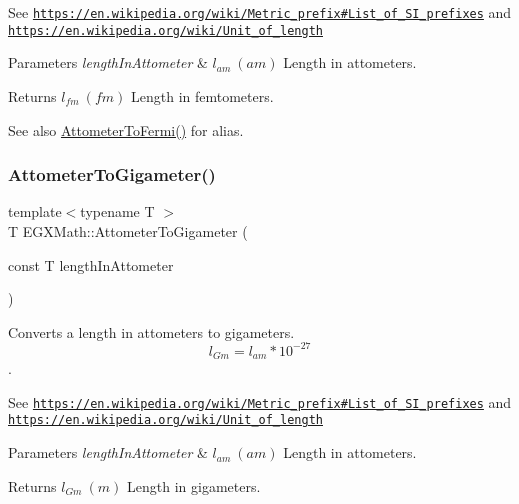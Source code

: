 See \href{https://en.wikipedia.org/wiki/Metric_prefix#List_of_SI_prefixes}{\tt https\+://en.\+wikipedia.\+org/wiki/\+Metric\+\_\+prefix\#\+List\+\_\+of\+\_\+\+S\+I\+\_\+prefixes} and \href{https://en.wikipedia.org/wiki/Unit_of_length}{\tt https\+://en.\+wikipedia.\+org/wiki/\+Unit\+\_\+of\+\_\+length} 
\begin{DoxyParams}{Parameters}
{\em length\+In\+Attometer} & $ l_{am}\ (am)$ Length in attometers. \\
\hline
\end{DoxyParams}
\begin{DoxyReturn}{Returns}
$ l_{fm}\ (fm)$ Length in femtometers. 
\end{DoxyReturn}
\begin{DoxySeeAlso}{See also}
\mbox{\hyperlink{group___e_g_x_math-_conversions-_length_conversions-_attometer-_non-_s_i_ga7dc342fa730e646b020d60aa6c2848ef}{Attometer\+To\+Fermi()}} for alias. 
\end{DoxySeeAlso}
\mbox{\label{group___e_g_x_math-_conversions-_length_conversions-_attometer-_s_i_ga6d8498c20f3df80b922e6cb076c35fb8}} 
\subsubsection{\texorpdfstring{Attometer\+To\+Gigameter()}{AttometerToGigameter()}}
{\footnotesize\ttfamily template$<$typename T $>$ \\
T E\+G\+X\+Math\+::\+Attometer\+To\+Gigameter (\begin{DoxyParamCaption}\item[{const T}]{length\+In\+Attometer }\end{DoxyParamCaption})}



Converts a length in attometers to gigameters. \[ l_{Gm}=l_{am} * 10^{-27} \]. 

See \href{https://en.wikipedia.org/wiki/Metric_prefix#List_of_SI_prefixes}{\tt https\+://en.\+wikipedia.\+org/wiki/\+Metric\+\_\+prefix\#\+List\+\_\+of\+\_\+\+S\+I\+\_\+prefixes} and \href{https://en.wikipedia.org/wiki/Unit_of_length}{\tt https\+://en.\+wikipedia.\+org/wiki/\+Unit\+\_\+of\+\_\+length} 
\begin{DoxyParams}{Parameters}
{\em length\+In\+Attometer} & $ l_{am}\ (am)$ Length in attometers. \\
\hline
\end{DoxyParams}
\begin{DoxyReturn}{Returns}
$ l_{Gm}\ (m)$ Length in gigameters. 
\end{DoxyReturn}
\mbox{\label{group___e_g_x_math-_conversions-_length_conversions-_attometer-_s_i_gab810b8625e44d4bb227bdff1b0ab2056}} 
